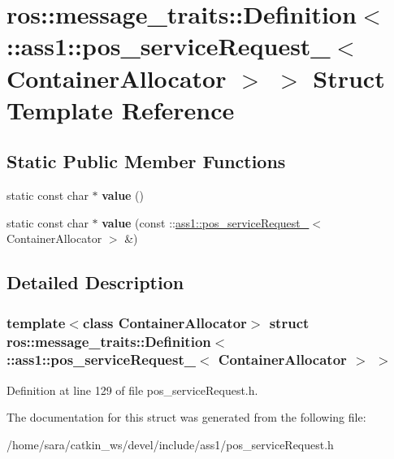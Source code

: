\hypertarget{structros_1_1message__traits_1_1Definition_3_01_1_1ass1_1_1pos__serviceRequest___3_01ContainerAllocator_01_4_01_4}{}\section{ros\+:\+:message\+\_\+traits\+:\+:Definition$<$ \+:\+:ass1\+:\+:pos\+\_\+service\+Request\+\_\+$<$ Container\+Allocator $>$ $>$ Struct Template Reference}
\label{structros_1_1message__traits_1_1Definition_3_01_1_1ass1_1_1pos__serviceRequest___3_01ContainerAllocator_01_4_01_4}
\subsection*{Static Public Member Functions}
\begin{DoxyCompactItemize}
\item 
\mbox{\label{structros_1_1message__traits_1_1Definition_3_01_1_1ass1_1_1pos__serviceRequest___3_01ContainerAllocator_01_4_01_4_a14f9913393054f6093cdc10ba41fb414}} 
static const char $\ast$ {\bfseries value} ()
\item 
\mbox{\label{structros_1_1message__traits_1_1Definition_3_01_1_1ass1_1_1pos__serviceRequest___3_01ContainerAllocator_01_4_01_4_a5ce857f590b78cc7bf8844e3304ad1e5}} 
static const char $\ast$ {\bfseries value} (const \+::\hyperlink{structass1_1_1pos__serviceRequest__}{ass1\+::pos\+\_\+service\+Request\+\_\+}$<$ Container\+Allocator $>$ \&)
\end{DoxyCompactItemize}


\subsection{Detailed Description}
\subsubsection*{template$<$class Container\+Allocator$>$\newline
struct ros\+::message\+\_\+traits\+::\+Definition$<$ \+::ass1\+::pos\+\_\+service\+Request\+\_\+$<$ Container\+Allocator $>$ $>$}



Definition at line 129 of file pos\+\_\+service\+Request.\+h.



The documentation for this struct was generated from the following file\+:\begin{DoxyCompactItemize}
\item 
/home/sara/catkin\+\_\+ws/devel/include/ass1/pos\+\_\+service\+Request.\+h\end{DoxyCompactItemize}
